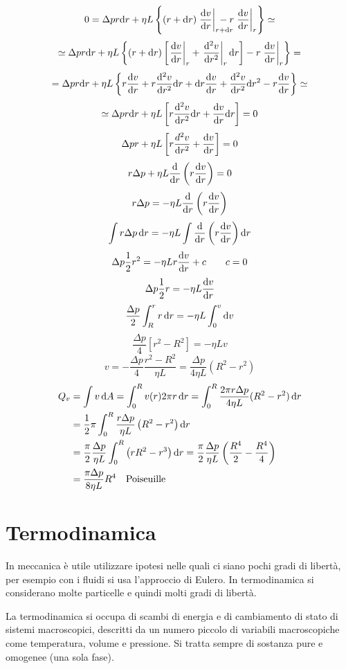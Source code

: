 $$0=\Delta p r\ud r+\eta L\left\{(r+\ud r)\left.\frac{\ud v}{\ud r}\right|_{r+\ud r}\!\!\!\!\!\!\!\!\!\!-r\left.\frac{\ud v}{\ud r}\right|_r\right\}\simeq$$
$$\simeq\Delta p r\mathrm{d} r+\eta L\left\{(r+\mathrm{d} r)\left[\left.\frac{\mathrm{d} v}{\mathrm{d} r}\right|_r+\left.\frac{\mathrm{d}^2 v}{\mathrm{d} r^2}\right|_r\mathrm{d} r\right]-r\left.\frac{\mathrm{d} v}{\mathrm{d} r}\right|_r\right\}=$$
$$=\Delta p r\mathrm{d} r+\eta L\left\{r\frac{\mathrm{d} v}{\mathrm{d} r}+r\frac{\mathrm{d}^2 v}{\mathrm{d} r^2}\mathrm{d} r+\mathrm{d} r\frac{\mathrm{d} v}{\mathrm{d} r}+\frac{\mathrm{d}^2 v}{\mathrm{d} r^2}\mathrm{d} r^2-r\frac{\mathrm{d} v}{\mathrm{d} r}\right\}\simeq$$
$$\simeq\Delta p r \mathrm{d} r+\eta L\left[r\frac{\mathrm{d}^2 v}{\mathrm{d} r^2}\mathrm{d} r+\frac{\mathrm{d} v}{\mathrm{d} r}\mathrm{d} r\right]=0$$
$$\Delta p r+\eta L\left[r\frac{d^2 v}{\mathrm{d} r^2}+\frac{\mathrm{d} v}{\mathrm{d} r}\right]=0$$
$$r\Delta p+\eta L\frac{\mathrm{d}}{\mathrm{d} r}\left(r \frac{\mathrm{d} v}{\mathrm{d} r}\right)=0$$
$$r\Delta p=-\eta L\frac{\mathrm{d}}{\mathrm{d} r}\left(r\frac{\mathrm{d} v}{\mathrm{d} r}\right)$$
$$\int r\Delta p\,\mathrm{d} r=-\eta L\int\frac{\mathrm{d}}{\mathrm{d} r}\left(r\frac{\mathrm{d} v}{\mathrm{d} r}\right)\mathrm{d} r$$
$$\Delta p\frac{1}{2}r^2=-\eta L r\frac{\mathrm{d} v}{\mathrm{d} r}+c\qquad c=0$$
$$\Delta p\frac{1}{2}r=-\eta L \frac{\mathrm{d} v}{\mathrm{d} r}$$
$$\frac{\Delta p}{2}\int_R^r r\,\mathrm{d} r=-\eta L\int_0^v \mathrm{d} v$$
$$\frac{\Delta p}{4}\left[r^2-R^2\right]=-\eta Lv$$
$$v=-\frac{\Delta p}{4}\frac{r^2-R^2}{\eta L}=\frac{\Delta p}{4\eta L}\left(R^2-r^2\right)$$
\begin{align*}
Q_v&=\int v \,\mathrm{d} A=\int_0^R v(r)2\pi r\,\mathrm{d} r=\int_0^R\frac{2\pi r\Delta p}{4\eta L}(R^2-r^2)\,\mathrm{d} r\\
&=\frac{1}{2}\pi\int_0^R\frac{r\Delta p}{\eta L}\left(R^2-r^2\right)\mathrm{d} r\\
&=\frac{\pi}{2}\frac{\Delta p}{\eta L}\int_0^R \left(rR^2-r^3\right)\mathrm{d} r=\frac{\pi}{2}\frac{\Delta p}{\eta L}\left(\frac{R^4}{2}-\frac{R^4}{4}\right)\\
&=\frac{\pi\Delta p}{8\eta L}R^4\quad\text{Poiseuille}
\end{align*}


\chapter{Termodinamica}

In meccanica è utile utilizzare ipotesi nelle quali ci siano pochi gradi di libertà, per esempio con i fluidi si usa l'approccio di Eulero. In termodinamica si considerano molte particelle e quindi molti gradi di libertà.

La termodinamica si occupa di scambi di energia e di cambiamento di stato di sistemi macroscopici, descritti da un numero piccolo di variabili macroscopiche come temperatura, volume e pressione. Si tratta sempre di sostanza pure e omogenee (una sola fase).

